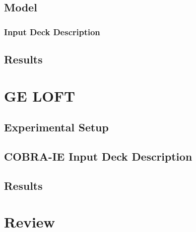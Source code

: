 \subsection{Model}
\subsubsection{Input Deck Description}
\subsection{Results}

\section{GE LOFT}
\subsection{Experimental Setup}
\subsection{COBRA-IE Input Deck Description}
\subsection{Results}


\section{Review}
